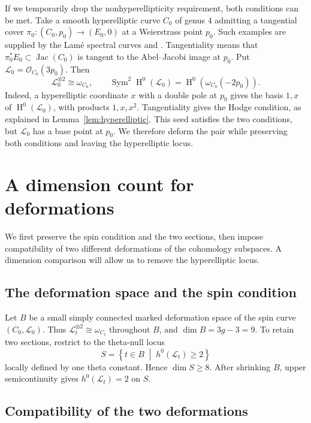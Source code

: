 \documentclass{amsart}
\DeclareMathOperator{\Sym}{Sym}
\DeclareMathOperator{\Hnm}{H}
\DeclareMathOperator{\Jac}{Jac}
\begin{document}
If we temporarily drop the nonhyperellipticity requirement, both conditions can be met.
Take a smooth hyperelliptic curve $C_0$ of genus $4$ admitting a
tangential cover $\pi_0:(C_0,p_0)\longrightarrow(E_0,0)$ at a Weierstrass
point $p_0$. Such examples are supplied by the Lam\'e spectral curves
\cite[Table~3 and Theorem~L]{maier} and \cite[Proposition~3.1]{eilbeck}.
Tangentiality means that $\pi_0^*E_0\subset\Jac(C_0)$ is tangent to the
Abel--Jacobi image at $p_0$. Put
$\mathcal{L}_0=\mathcal{O}_{C_0}(3p_0)$. Then
$$
\mathcal{L}_0^{\otimes2}\cong\omega_{C_0},\qquad
\Sym^2\Hnm^0(\mathcal{L}_0)
=\Hnm^0\left(\omega_{C_0}(-2p_0)\right).
$$
Indeed, a hyperelliptic coordinate $x$ with a double pole at $p_0$ gives
the basis $1,x$ of $\Hnm^0(\mathcal{L}_0)$, with products $1,x,x^2$.
Tangentiality gives the Hodge condition, as explained in
Lemma~\ref{lem:hyperelliptic}. This seed satisfies the two conditions,
but $\mathcal{L}_0$ has a base point at $p_0$. We therefore deform the
pair while preserving both conditions and leaving the hyperelliptic
locus.

\section{A dimension count for deformations}

We first preserve the spin condition and the two sections, then impose
compatibility of two different deformations of the cohomology subspaces.
A dimension comparison will allow us to remove the hyperelliptic locus.

\subsection{The deformation space and the spin condition}\label{subsec:spin}

Let $B$ be a small simply connected marked deformation space of the spin
curve $(C_0,\mathcal{L}_0)$. Thus
$\mathcal{L}_t^{\otimes2}\cong\omega_{C_t}$ throughout $B$, and
$\dim B=3g-3=9$. To retain two sections, restrict to the theta-null locus
$$
S=\left\{t\in B\;\middle|\;h^0(\mathcal{L}_t)\geqslant2\right\}
$$
locally defined by one theta constant. Hence $\dim S\geqslant8$.
After shrinking $B$, upper semicontinuity gives
$h^0(\mathcal{L}_t)=2$ on $S$.

\subsection{Compatibility of the two deformations}\label{subsec:compatibility}
\end{document}
